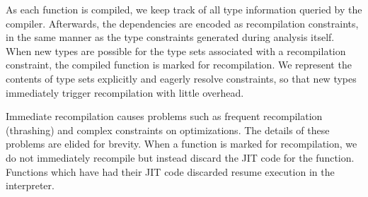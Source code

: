 As each function is compiled, we keep track of all type information queried
by the compiler.
Afterwards, the dependencies are encoded as recompilation constraints,
in the same manner as the type constraints generated during analysis itself.
When new types are possible for the type sets associated with a recompilation
constraint, the compiled function is marked for recompilation.
We represent the contents of type sets explicitly and eagerly resolve
constraints, so that new types immediately
trigger recompilation with little overhead.







Immediate recompilation causes problems such as frequent recompilation
(thrashing) and complex constraints on optimizations. The details of these
problems are elided for brevity. When a function is marked for recompilation, we
do not immediately recompile but instead discard the JIT code for the
function. Functions which have had their JIT code discarded resume execution
in the interpreter.

